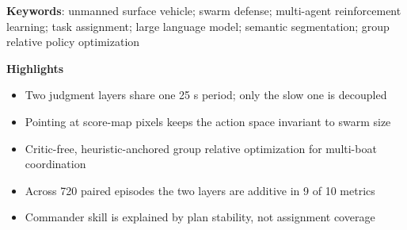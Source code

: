 \vspace{4pt}
\noindent\textbf{Keywords}\;:\;
unmanned surface vehicle; swarm defense; multi-agent reinforcement learning; task assignment;
large language model; semantic segmentation; group relative policy optimization

\vspace{6pt}
\noindent\textbf{Highlights}
\begin{itemize}[leftmargin=1.1em, itemsep=1pt, topsep=2pt, parsep=0pt]
\item Two judgment layers share one 25 s period; only the slow one is decoupled
\item Pointing at score-map pixels keeps the action space invariant to swarm size
\item Critic-free, heuristic-anchored group relative optimization for multi-boat coordination
\item Across 720 paired episodes the two layers are additive in 9 of 10 metrics
\item Commander skill is explained by plan stability, not assignment coverage
\end{itemize}
